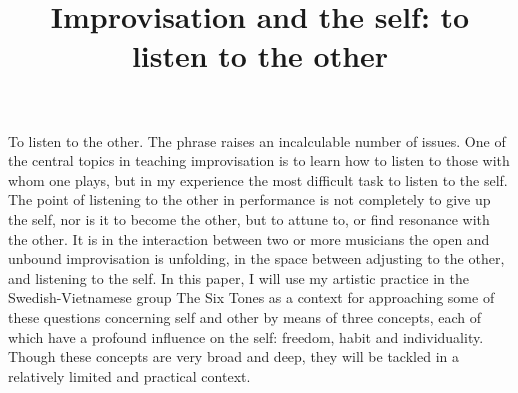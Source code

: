 \documentclass[a4paper]{article}
\title{Improvisation and the self: to listen to the other}
\begin{document}
\maketitle

\thispagestyle{empty}

\section*{ }




To listen to the other. The phrase raises an incalculable number of issues. One of the central topics in teaching improvisation is to learn how to listen to those with whom one plays, but in my experience the most difficult task to listen to the self. The point of listening to the other in performance is not completely to give up the self, nor is it to become the other, but to attune to, or find resonance with the other. It is in the interaction between two or more musicians the open and unbound improvisation is unfolding, in the space between adjusting to the other, and listening to the self. In this paper, I will use my artistic practice in the Swedish-Vietnamese group The Six Tones as a context for approaching some of these questions concerning self and other by means of three concepts, each of which have a profound influence on the self: freedom, habit and individuality. Though these concepts are very broad and deep, they will be tackled in a relatively limited and practical context. 
\end{document}

